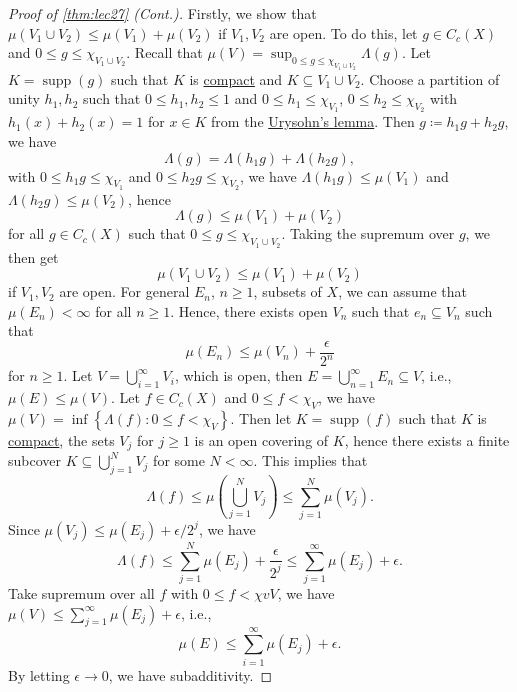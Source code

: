 \begin{proof}[Proof of \autoref{thm:lec27} (Cont.)]
	Firstly, we show that \(\mu (V_1 \cup V_2) \leq \mu (V_1) + \mu (V_2)\) if \(V_1, V_2\) are open. To do this, let \(g\in C_c(X)\) and \(0 \leq g \leq \chi _{V_1 \cup V_2}\). Recall that \(\mu (V) = \sup _{0 \leq g\leq \chi _{V_1 \cup V_2}} \Lambda (g)\). Let \(K = \mathop{\mathrm{supp}}(g) \) such that \(K\) is \hyperref[def:compact]{compact} and \(K \subseteq V_1 \cup V_2\). Choose a partition of unity \(h_1, h_2\) such that \(0 \leq h_1, h_2 \leq 1\) and \(0 \leq h_1 \leq \chi _{V_1}\), \(0 \leq h_2 \leq \chi _{V_2}\) with \(h_1(x) + h_2(x) = 1\) for \(x\in K\) from the \hyperref[thm:Urysohn-lemma]{Urysohn's lemma}. Then \(g \coloneqq h_1 g + h_2 g\), we have
	\[
		\Lambda (g) = \Lambda (h_1 g) + \Lambda (h_2 g),
	\]
	with \(0 \leq h_1 g \leq \chi _{V_1}\) and \(0 \leq h_2 g \leq \chi _{V_2}\), we have \(\Lambda (h_1 g) \leq \mu (V_1)\) and \(\Lambda (h_2 g)\leq \mu (V_2)\), hence
	\[
		\Lambda (g) \leq \mu (V_1) + \mu (V_2)
	\]
	for all \(g\in C_c(X)\) such that \(0 \leq g \leq \chi _{V_1 \cup V_2}\). Taking the supremum over \(g\), we then get
	\[
		\mu (V_1 \cup V_2) \leq \mu (V_1) + \mu (V_2)
	\]
	if \(V_1, V_2\) are open. For general \(E_n\), \(n \geq 1\), subsets of \(X\), we can assume that \(\mu (E_n) < \infty \) for all \(n \geq 1\). Hence, there exists open \(V_n\) such that \(e_n \subseteq V_n\) such that
	\[
		\mu (E_n) \leq \mu (V_n) + \frac{\epsilon}{2^n}
	\]
	for \(n\geq 1\). Let \(V = \bigcup_{i=1}^{\infty} V_i\), which is open, then \(E = \bigcup_{n=1}^{\infty} E_n \subseteq V\), i.e., \(\mu (E) \leq \mu (V)\). Let \(f\in C_c(X)\) and \(0 \leq f < \chi _V\), we have \(\mu (V) = \inf \left\{ \Lambda (f) \colon 0 \leq f < \chi _V \right\} \). Then let \(K = \mathop{\mathrm{supp}}(f) \) such that \(K\) is \hyperref[def:compact]{compact}, the sets \(V_j\) for \(j \geq 1\) is an open covering of \(K\), hence there exists a finite subcover \(K \subseteq \bigcup_{j=1}^{N} V_j\) for some \(N < \infty \). This implies that
	\[
		\Lambda (f) \leq \mu \left( \bigcup_{j=1}^{N} V_j \right) \leq \sum_{j=1}^{N} \mu (V_j).
	\]
	Since \(\mu (V_j) \leq \mu (E_j) + \epsilon / 2^j\), we have
	\[
		\Lambda (f) \leq \sum_{j=1}^{N} \mu (E_j) + \frac{\epsilon}{2^j} \leq \sum_{j=1}^{\infty} \mu (E_j) + \epsilon.
	\]
	Take supremum over all \(f\) with \(0 \leq f < \chi vV\), we have \(\mu (V) \leq \sum_{j=1}^{\infty} \mu (E_j) + \epsilon \), i.e.,
	\[
		\mu (E) \leq \sum_{i=1}^{\infty} \mu (E_j) + \epsilon.
	\]
	By letting \(\epsilon \to 0\), we have subadditivity.


\end{proof}
